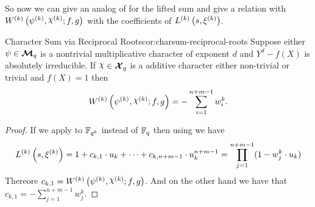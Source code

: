 So now we can give an analog of \LLeadCoeffthm for the lifted sum and give a relation with $\Wmixl{k}{f}{g}$ with the coefficients of $L^{(k)}\left(s,\xi^{(k)}\right)$. 
\begin{corolary}{Character Sum via Reciprocal Roots}{cor:charsum-reciprocal-roots}
  Suppose either $\psi\in\boldsymbol{\mathcal{M}}_q$ is a nontrivial multiplicative character of exponent $d$ and $Y^d-f(X)$ is absolutely irreducible. If $\chi\in\Xq$ is a additive character either non-trivial or trivial and $f(X)=1$ then $$W^{(k)}\lt(\psi^{(k)},\chi^{(k)};f,g\rt)=-\sum_{i=1}^{n+m-1}w_i^k.$$
\end{corolary}
\begin{proof}
  If we apply \LLeadCoeffthm to $\mathbb{F}_{q^k}$ instead of $\mathbb{F}_q$ then using \LiftedLRootscor we have $$L^{(k)}\left(s,\xi^{(k)}\right)=1+c_{k,1}\cdot u_k+\cdots +c_{k,n+m-1}\cdot u_k^{n+m-1}=\prod_{j=1}^{n+m-1}(1-w_j^k\cdot u_k)$$Thereore $c_{k,1}=\Wmixl{k}{f}{g}$. And on the other hand we have that $c_{k,1}=-\sum_{j=1}^{n+m-1}w_j^k$. 
\end{proof}